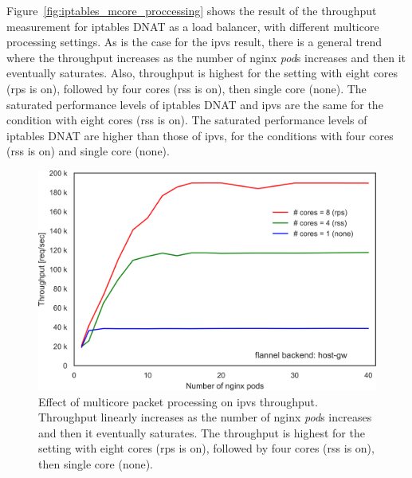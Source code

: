Figure~\ref{fig:iptables_mcore_proccessing} shows the result of the throughput measurement for iptables DNAT as a load balancer, with different multicore processing settings.
As is the case for the ipvs result, there is a general trend where the throughput increases as the number of nginx {\em pod}s increases and then it eventually saturates.
Also, throughput is highest for the setting with eight cores (rps is on), followed by four cores (rss is on), then single core (none).
%
The saturated performance levels of iptables DNAT and ipvs are the same for the condition with eight cores (rss is on). 
The saturated performance levels of iptables DNAT are higher than those of ipvs, for the conditions with four cores (rss is on) and single core (none).

\begin{figure}[h]
  \centering
  \includegraphics[width=0.75\columnwidth]{Figs/ipvs_mcore_proccessing}
  \par\bigskip
  \centering
  \begin{minipage}{0.9\columnwidth}
    \caption[Effect of multicore packet processing on ipvs throughput]{
Effect of multicore packet processing on ipvs throughput.
Throughput linearly increases as the number of nginx {\em pod}s increases and then it eventually saturates.
The throughput is highest for the setting with eight cores (rps is on), followed by four cores (rss is on), then single core (none).
    }
    \label{fig:ipvs_mcore_proccessing}
  \end{minipage}
\end{figure}


